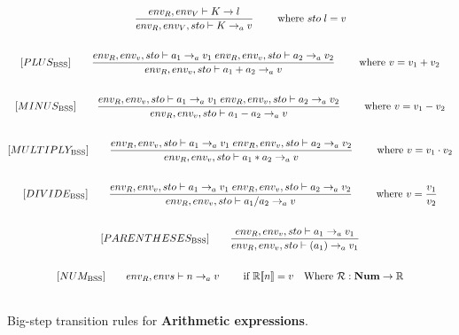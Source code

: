\begin{figure}[htbp]
	\centering
	\begin{gather*}
		[Gvar_\text{BSS}]
		\qquad \dfrac
		{env_R, env_V \vdash K \rightarrow l}
		{env_R, env_V, sto \vdash K \rightarrow_a v}
		\qquad \text{ where }sto \; l = v
		\\
		\\
		[PLUS_\text{BSS}] 
		\qquad \dfrac
		{env_R,\envs \vdash a_1 \rightarrow_a v_1 \; env_R, \envs \vdash a_2 \rightarrow_a v_2}
		{env_R,\envs \vdash a_1 + a_2 \rightarrow_a v}
		\qquad \text{ where }v = v_1 + v_2
		\\
		\\
		[MINUS_\text{BSS}] 
		\qquad \dfrac
		{env_R, \envs \vdash a_1 \rightarrow_a v_1 \; env_R, \envs \vdash a_2 \rightarrow_a v_2}
		{env_R, \envs \vdash a_1 - a_2 \rightarrow_a v}
		\qquad \text{ where }v = v_1 - v_2
		\\
		\\
		[MULTIPLY_\text{BSS}] 
		\qquad \dfrac
		{env_R, \envs \vdash a_1 \rightarrow_a v_1 \; env_R, \envs \vdash a_2 \rightarrow_a v_2}
		{env_R, \envs \vdash a_1 * a_2 \rightarrow_a v}
		\qquad \text{ where }v = v_1 \cdot v_2
		\\
		\\
		[DIVIDE_\text{BSS}] 
		\qquad \dfrac
		{env_R, \envs \vdash a_1 \rightarrow_a v_1 \; env_R, \envs \vdash a_2 \rightarrow_a v_2}
		{env_R, \envs \vdash a_1 / a_2 \rightarrow_a v}
		\qquad \text{ where }v = \dfrac{v_1}{v_2}
		\\
		\\
		[PARENTHESES_\text{BSS}] 
		\qquad \dfrac
		{env_R, \envs \vdash a_1 \rightarrow_a v_1}
		{env_R, \envs \vdash (a_1) \rightarrow_a v_1}
		\\
		\\
		[NUM_\text{BSS}] 
		\qquad env_R, envs \vdash n \rightarrow_a v
		\qquad \text{ if } \mathbb{R}[\![n]\!] = v \quad \text{Where } \mathcal{R}:\textbf{Num}\rightarrow \mathbb{R}
		\\
		\\
	\end{gather*}
	\caption{Big-step transition rules for \textbf{Arithmetic expressions}.}
	\label{fig:BssArithm}
\end{figure}

